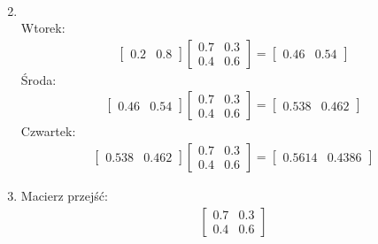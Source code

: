 \documentclass[main.tex]{subfiles}
\begin{document}
\begin{enumerate}
\begin{align*}
        \end{align*}
        \item \hfill \\
        Wtorek:
        \begin{align*}
            \begin{bmatrix}
                0.2 & 0.8
            \end{bmatrix}
            \begin{bmatrix}
                0.7 & 0.3\\
                0.4 & 0.6
            \end{bmatrix}
            =
            \begin{bmatrix}
                0.46 & 0.54
            \end{bmatrix}
        \end{align*}
        Środa:
        \begin{align*}
            \begin{bmatrix}
                0.46 & 0.54
            \end{bmatrix}
            \begin{bmatrix}
                0.7 & 0.3\\
                0.4 & 0.6
            \end{bmatrix}
            =
            \begin{bmatrix}
                0.538 & 0.462
            \end{bmatrix}
        \end{align*}
        Czwartek:
        \begin{align*}
            \begin{bmatrix}
                0.538 & 0.462
            \end{bmatrix}
            \begin{bmatrix}
                0.7 & 0.3\\
                0.4 & 0.6
            \end{bmatrix}
            =
            \begin{bmatrix}
                0.5614 & 0.4386
            \end{bmatrix}
        \end{align*}
        \item Macierz przejść:
        \begin{align*}
            \begin{bmatrix}
                0.7 & 0.3\\
                0.4 & 0.6
            \end{bmatrix}

\end{align*}
\end{enumerate}
\end{document}

